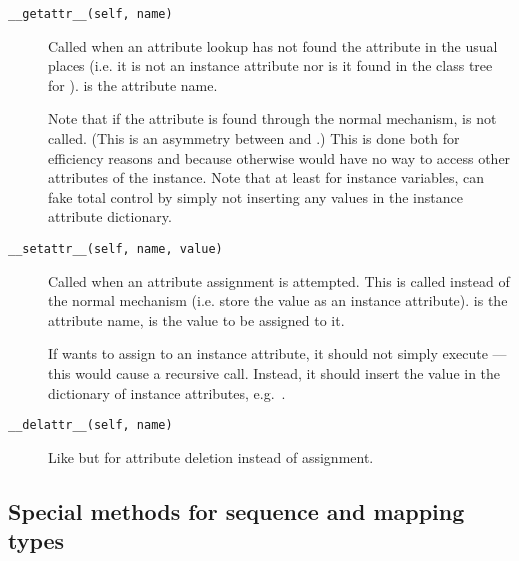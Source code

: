 \begin{description}

\item[{\tt __getattr__(self, name)}]
Called when an attribute lookup has not found the attribute in the
usual places (i.e. it is not an instance attribute nor is it found in
the class tree for ).   is the attribute name.

Note that if the attribute is found through the normal mechanism,
 is not called.  (This is an asymmetry between
 and .)
This is done both for efficiency reasons and because otherwise
 would have no way to access other attributes of the
instance.
Note that at least for instance variables,  can fake
total control by simply not inserting any values in the instance
attribute dictionary.

\item[{\tt __setattr__(self, name, value)}]
Called when an attribute assignment is attempted.  This is called
instead of the normal mechanism (i.e. store the value as an instance
attribute).   is the attribute name,  is the
value to be assigned to it.

If  wants to assign to an instance attribute, it
should not simply execute  --- this would
cause a recursive call.  Instead, it should insert the value in the
dictionary of instance attributes, e.g.\ .

\item[{\tt __delattr__(self, name)}]
Like  but for attribute deletion instead of
assignment.

\end{description}


\subsection{Special methods for sequence and mapping types}

